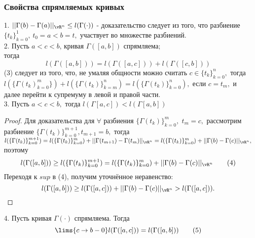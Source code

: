 \documentclass[main]{subfiles}
\begin{document}
\subsubsection{Свойства спрямляемых кривых}
1. $|| \Gamma(b)-\Gamma(a)||_{\vR^n}\leq l(\Gamma(\cdot))$ - доказательство следует из того, что разбиение $\{ t_k\}^1_{k=0},\ t_0=a<b=t,$ участвует во множестве разбиений.\\
2. Пусть $a<c<b$, кривая $\Gamma([a,b])$ спрямляема; \\
тогда \[l(\Gamma([a,b]))=l(\Gamma([a,c]))+l(\Gamma([c,b]))\tag{3}\]
(3) следует из того, что, не умаляя общности можно считать $c\in \{t_k\}^n_{k=0},$ тогда\\ \( l(\{\Gamma(t_k)^m_{k=0}\})+l(\{\Gamma(t_k)\}^n_{k=m})=l(\{\Gamma(t_k)\}^n_{k=0}), \) если $c=t_m,$ и далее перейти к супремуму в левой и правой части.\\
3. Пусть $a<c<b,$ тогда $l(\Gamma[a,c])<l(\Gamma[a,b])$
\begin{proof}
    Для доказательства для $\forall$ разбиения $\{\Gamma(t_k)\}_{k=0}^m,$ $t_m=c,$ рассмотрим разбиение $\{ \Gamma(t_k)\}^{m+1}_{k=0}, t_{m+1}=b,$ тогда\\
    $l(\{\Gamma(t_k)\}^{m+1}_{k=0})=l(\{\Gamma(t_k)\}^m_{k=0})+||\Gamma(t_{m+1})-
        \Gamma(t_m)||_{{\vR^n}}=l(\{\Gamma(t_k)\}^m_{k=0})+||\Gamma(b)-\Gamma(c)||_{\vR^n},$ поэтому
    \[l(\Gamma([a,b]))\geq l(\{\Gamma(t_k)\}_{k=0}^{m+1})= l(\{\Gamma(t_k)\}_{k=0}^m)+||\Gamma(b)-\Gamma(c)||_{{\vR^n}} \tag{4} \]
    Переходя к $sup$ в (4), получим уточнённое неравенство:
    \[ l(\Gamma([a,b]))\geq l(\Gamma([a,c]))+||\Gamma(b)-\Gamma(c)||_{\vR^n}>l(\Gamma([a,c])). \]
\end{proof}
4. Пусть кривая $\Gamma(\cdot)$ спрямляема. Тогда \[ \lims{c\to b-0} l(\Gamma([a,c]))=l(\Gamma([a,b]))\tag{5} \]
\end{document}
